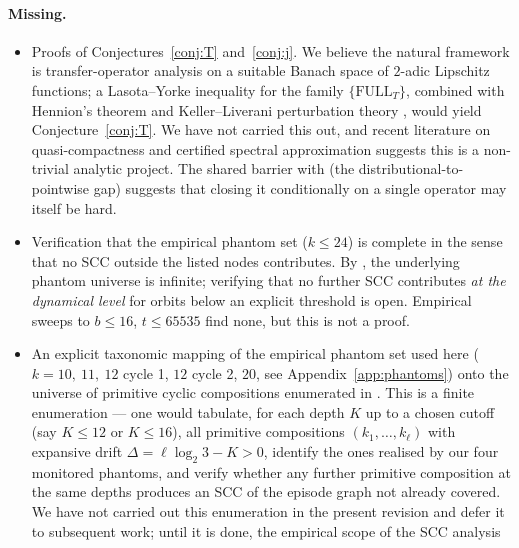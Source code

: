 \documentclass[11pt,a4paper]{article}
\theoremstyle{definition}
\newcommand{\full}{\mathrm{FULL}}
\begin{document}
\paragraph{Missing.}
\begin{itemize}
  \item Proofs of Conjectures~\ref{conj:T} and~\ref{conj:j}. We
        believe the natural framework is transfer-operator analysis
        on a suitable Banach space of $2$-adic Lipschitz functions;
        a Lasota--Yorke inequality for the family
        $\{\full_T\}$, combined with Hennion's theorem and
        Keller--Liverani perturbation theory \cite{kellerliverani},
        would yield Conjecture~\ref{conj:T}. We have not carried
        this out, and recent literature on quasi-compactness
        \cite{quasicompact} and certified spectral approximation
        \cite{certifiedspectral} suggests this is a non-trivial
        analytic project. The shared barrier with
        \cite[Sect.~9]{chang2026} (the distributional-to-pointwise
        gap) suggests that closing it conditionally on a single
        operator may itself be hard.
  \item Verification that the empirical phantom set ($k \le 24$) is
        complete in the sense that no SCC outside the listed nodes
        contributes. By \cite[Theorem~7.15]{chang2026}, the
        underlying phantom universe is infinite; verifying that
        no further SCC contributes \emph{at the dynamical level}
        for orbits below an explicit threshold is open.
        Empirical sweeps to $b \le 16$, $t \le 65535$ find none,
        but this is not a proof.
  \item An explicit taxonomic mapping of the empirical phantom
        set used here ($k = 10,\ 11,\ 12$ cycle 1, $12$ cycle 2,
        $20$, see Appendix~\ref{app:phantoms}) onto the universe of
        primitive cyclic compositions enumerated in
        \cite[Theorem~7.15]{chang2026}. This is a finite
        enumeration --- one would tabulate, for each depth $K$ up
        to a chosen cutoff (say $K \le 12$ or $K \le 16$), all
        primitive compositions $(k_1, \ldots, k_\ell)$ with
        expansive drift $\Delta = \ell \log_2 3 - K > 0$, identify
        the ones realised by our four monitored phantoms, and
        verify whether any further primitive composition at the
        same depths produces an SCC of the episode graph not
        already covered. We have not carried out this enumeration
        in the present revision and defer it to subsequent work;
        until it is done, the empirical scope of the SCC analysis

\end{itemize}
\end{document}
